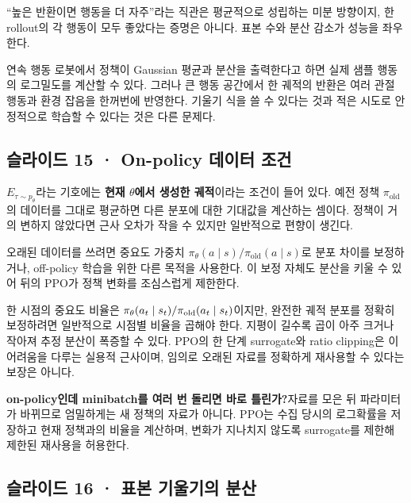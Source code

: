 \documentclass[11pt,a4paper]{article}
\begin{document}
“높은 반환이면 행동을 더 자주”라는 직관은 평균적으로 성립하는 미분 방향이지, 한 rollout의 각 행동이 모두 좋았다는 증명은 아니다. 표본 수와 분산 감소가 성능을 좌우한다.\par

연속 행동 로봇에서 정책이 Gaussian 평균과 분산을 출력한다고 하면 실제 샘플 행동의 로그밀도를 계산할 수 있다. 그러나 큰 행동 공간에서 한 궤적의 반환은 여러 관절 행동과 환경 잡음을 한꺼번에 반영한다. 기울기 식을 쓸 수 있다는 것과 적은 시도로 안정적으로 학습할 수 있다는 것은 다른 문제다.\par

\subsection{슬라이드 15 · On-policy 데이터 조건}

$E_{\tau\sim p_\theta}$라는 기호에는 \textbf{현재 $\theta$에서 생성한 궤적}이라는 조건이 들어 있다. 예전 정책 $\pi_{\mathrm{old}}$의 데이터를 그대로 평균하면 다른 분포에 대한 기대값을 계산하는 셈이다. 정책이 거의 변하지 않았다면 근사 오차가 작을 수 있지만 일반적으로 편향이 생긴다.\par

오래된 데이터를 쓰려면 중요도 가중치 $\pi_\theta(a\mid s)/\pi_{\mathrm{old}}(a\mid s)$로 분포 차이를 보정하거나, off-policy 학습을 위한 다른 목적을 사용한다. 이 보정 자체도 분산을 키울 수 있어 뒤의 PPO가 정책 변화를 조심스럽게 제한한다.\par

한 시점의 중요도 비율은 $\pi_\theta(a_t\mid s_t)/\pi_{\rm old}(a_t\mid s_t)$이지만, 완전한 궤적 분포를 정확히 보정하려면 일반적으로 시점별 비율을 곱해야 한다. 지평이 길수록 곱이 아주 크거나 작아져 추정 분산이 폭증할 수 있다. PPO의 한 단계 surrogate와 ratio clipping은 이 어려움을 다루는 실용적 근사이며, 임의로 오래된 자료를 정확하게 재사용할 수 있다는 보장은 아니다.\par

\par\medskip\noindent\textbf{on-policy인데 minibatch를 여러 번 돌리면 바로 틀린가?}\quad 자료를 모은 뒤 파라미터가 바뀌므로 엄밀하게는 새 정책의 자료가 아니다. PPO는 수집 당시의 로그확률을 저장하고 현재 정책과의 비율을 계산하며, 변화가 지나치지 않도록 surrogate를 제한해 제한된 재사용을 허용한다.\par

\subsection{슬라이드 16 · 표본 기울기의 분산}
\end{document}
